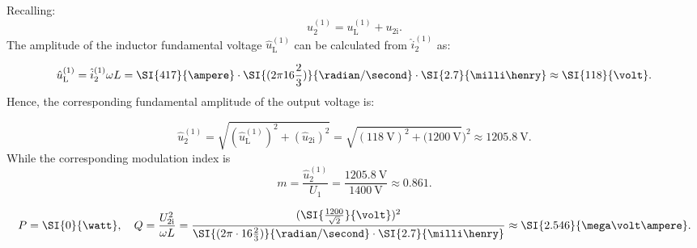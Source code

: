 \begin{solutionblock}
Recalling:
   $$ u^\mathrm{(1)}_\mathrm{2} = u^\mathrm{(1)}_\mathrm{L} +  u_\mathrm{2i}.$$
The amplitude of the inductor fundamental voltage $\hat{u}^\mathrm{(1)}_\mathrm{L}$ can be calculated from $\hat{i}^\mathrm{(1)}_\mathrm{2}$ as:

    $$\hat{u}^\mathrm{(1)}_\mathrm{L} = \hat{i}^\mathrm{(1)}_\mathrm{2} \omega L = \SI{417}{\ampere} \cdot \SI{(2 \pi 16\frac{2}{3})}{\radian/\second} \cdot \SI{2.7}{\milli \henry} \approx \SI{118}{\volt}.$$
Hence, the corresponding fundamental amplitude of the output voltage is: 

   $$ \hat{u}^\mathrm{(1)}_\mathrm{2} = \sqrt{(\hat{u}^\mathrm{(1)}_\mathrm{L})^2 + (\hat{u}_\mathrm{2i})^2} = \sqrt{(\SI{118}{\volt})^2 + (\SI{1200}{\volt}})^2 \approx \SI{1205.8}{\volt}.$$
   While the corresponding modulation index is 
    $$m = \frac{\hat{u}^\mathrm{(1)}_\mathrm{2}}{U_{\mathrm{1}}} = \frac{\SI{1205.8}{\volt}}{\SI{1400}{\volt}} \approx 0.861.$$
\end{solutionblock}
\begin{solutionblock}
   $$ P = \SI{0}{\watt}, \quad
    Q= \frac{U_\mathrm{2i}^2}{\omega L} = \frac{(\SI{\frac{1200}{\sqrt{2}}}{\volt})^2}{\SI{(2\pi \cdot16\frac{2}{3})}{\radian/\second} \cdot \SI{2.7}{\milli \henry}} \approx \SI{2.546}{\mega \volt \ampere}.$$
\end{solutionblock}






